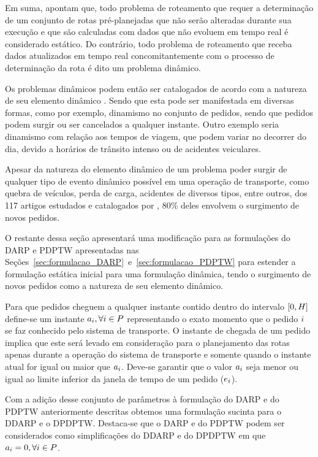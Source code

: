 Em suma, \textcite{psaraftis_dynamic_2015} apontam que, 
todo problema de roteamento que requer a determinação de um conjunto
de rotas pré-planejadas que não serão alteradas durante sua execução e que 
são calculadas com dados que não evoluem em tempo real é considerado estático.
Do contrário, todo problema de roteamento que receba dados atualizados em tempo
real concomitantemente com o processo de determinação da rota é dito um
problema dinâmico. 

Os problemas dinâmicos podem então ser catalogados de acordo com a natureza de
seu elemento dinâmico \cite{psaraftis_dynamic_2015}.
Sendo que esta pode ser manifestada em diversas formas, como por exemplo,
dinamismo no conjunto de pedidos, sendo que pedidos podem surgir ou ser
cancelados a qualquer instante.
Outro exemplo seria dinamismo com relação aos tempos de viagem, que podem
variar no decorrer do dia, devido a horários de trânsito intenso ou de
acidentes veiculares.

Apesar da natureza do elemento dinâmico de um problema poder surgir de qualquer
tipo de evento dinâmico possível em uma operação de transporte, como quebra de
veículos, perda de carga, acidentes de diversos tipos, entre outros, dos 117
artigos estudados e catalogados por  \textcite{psaraftis_dynamic_2015}, 80\%
deles envolvem o surgimento de novos pedidos.

O restante dessa seção apresentará uma modificação para as formulações do DARP
e PDPTW apresentadas nas 
Seções~\ref{sec:formulacao_DARP}~e~\ref{sec:formulacao_PDPTW} para estender a
formulação estática inicial para uma formulação dinâmica, tendo o surgimento de
novos pedidos como a natureza de seu elemento dinâmico.

Para que pedidos cheguem a qualquer instante contido dentro
do intervalo $[0, H]$ define-se um instante 
$a_i, \forall i \in P$ representando 
o exato momento que o pedido $i$ se faz conhecido pelo sistema de 
transporte.
O instante de chegada de um pedido implica que este será levado
em consideração para o planejamento das rotas apenas durante a
operação do sistema de transporte e somente quando o instante atual for
igual ou maior que $a_i$.
Deve-se garantir que o valor $a_i$ seja menor ou igual ao 
limite inferior da janela de tempo de um pedido 
($e_i$).

Com a adição desse conjunto de parâmetros à formulação do DARP e do PDPTW
anteriormente descritas obtemos uma formulação sucinta para o DDARP e o DPDPTW.
Destaca-se que o DARP e do PDPTW podem ser considerados como simplificações do
DDARP e do DPDPTW em que $a_i = 0, \forall i \in
P$.


